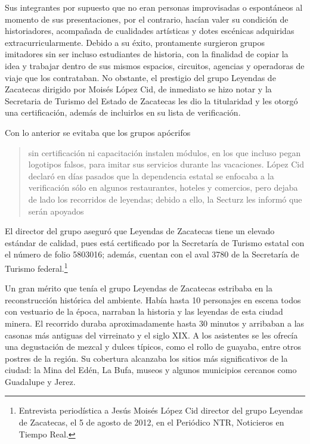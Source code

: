 Sus integrantes por supuesto que no eran personas improvisadas o espontáneos al
momento de sus presentaciones, por el contrario, hacían valer su condición de
historiadores,  acompañada de cualidades artísticas y dotes escénicas adquiridas
extracurricularmente. Debido a su éxito, prontamente surgieron grupos imitadores
sin ser incluso estudiantes de historia, con la finalidad de copiar la idea y
trabajar dentro de sus mismos espacios, circuitos, agencias y operadoras de
viaje que los contrataban. No obstante, el prestigio del grupo Leyendas de
Zacatecas dirigido por Moisés López Cid,  de inmediato se hizo notar y la
Secretaria de Turismo del Estado de Zacatecas les dio la titularidad y les
otorgó una certificación, además de incluirlos en su lista de verificación. 


Con lo anterior se evitaba que los grupos apócrifos 


\begin{quotation}
sin certificación ni capacitación instalen módulos, en los que incluso 
pegan logotipos falsos, para imitar sus servicios durante las 
vacaciones. López Cid declaró en días pasados que la dependencia 
estatal se enfocaba a la verificación sólo en algunos restaurantes, 
hoteles y comercios, pero dejaba de lado los recorridos de leyendas; 
debido a ello, la Secturz les informó que serán apoyados 
\end{quotation}

El director del grupo aseguró que Leyendas de Zacatecas tiene un 
elevado estándar de calidad, pues está certificado por la Secretaría de 
Turismo estatal con el número de folio 5803016; además, cuentan con el 
aval 3780 de la Secretaría de Turismo federal.\footnote{Entrevista 
periodística a Jesús Moisés López Cid director del grupo Leyendas de 
Zacatecas, el 5 de agosto de 2012, en el Periódico NTR, Noticieros en 
Tiempo Real.}

\bigskip
Un gran mérito que tenía el grupo Leyendas de Zacatecas estribaba en la
reconstrucción histórica del ambiente. Había hasta 10 personajes en escena
todos con vestuario de la época, narraban la historia y las leyendas de esta
ciudad minera. El recorrido duraba aproximadamente hasta 30 minutos y arribaban
a las casonas más antiguas del virreinato y el siglo XIX\@. A los asistentes se
les ofrecía una degustación de mezcal y dulces típicos, como el rollo
de guayaba, entre otros postres de la región. Su cobertura alcanzaba los sitios
más significativos de la ciudad: la Mina del Edén, La Bufa, museos y
algunos municipios cercanos como Guadalupe y Jerez.

